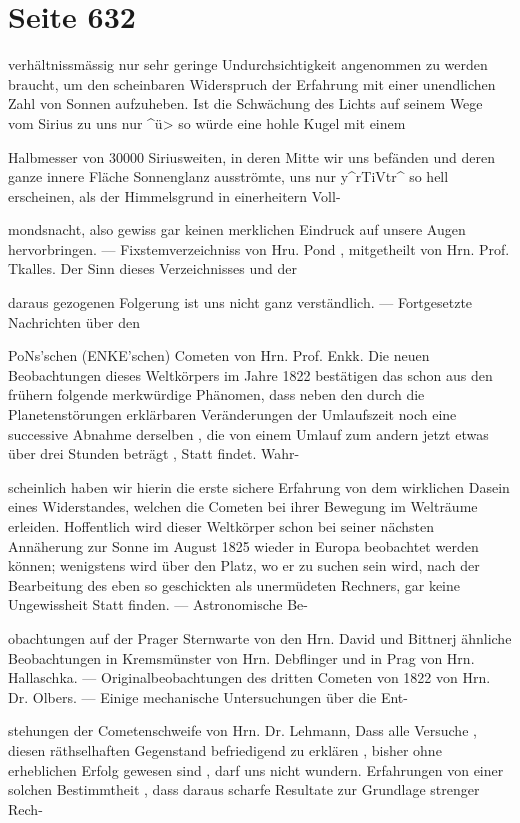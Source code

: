 \documentclass[10pt,a4paper]{article}
\begin{document}
\newpage
\section*{Seite 632}
verhältnissmässig nur sehr geringe Undurchsichtigkeit angenommen zu werden braucht, um den scheinbaren Widerspruch der Erfahrung mit einer unendlichen Zahl von Sonnen aufzuheben. Ist die Schwächung des Lichts auf seinem Wege vom Sirius zu uns nur \textasciicircum{}ü> so würde eine hohle Kugel mit einem

Halbmesser von 30000 Siriusweiten, in deren Mitte wir uns befänden und deren ganze innere Fläche Sonnenglanz ausströmte, uns nur y\textasciicircum{}rTiVtr\textasciicircum{} so hell erscheinen, als der Himmelsgrund in einerheitern Voll-

mondsnacht, also gewiss gar keinen merklichen Eindruck auf unsere Augen hervorbringen. — Fixstemverzeichniss von Hru. Pond , mitgetheilt von Hrn. Prof. Tkalles. Der Sinn dieses Verzeichnisses und der

daraus gezogenen Folgerung ist uns nicht ganz verständlich. — Fortgesetzte Nachrichten über den

PoNs'schen (ENKE'schen) Cometen von Hrn. Prof. Enkk. Die neuen Beobachtungen dieses Weltkörpers im Jahre 1822 bestätigen das schon aus den frühern folgende merkwürdige Phänomen, dass neben den durch die Planetenstörungen erklärbaren Veränderungen der Umlaufszeit noch eine successive Abnahme derselben , die von einem Umlauf zum andern jetzt etwas über drei Stunden beträgt , Statt findet. Wahr-

scheinlich haben wir hierin die erste sichere Erfahrung von dem wirklichen Dasein eines Widerstandes, welchen die Cometen bei ihrer Bewegung im Welträume erleiden. Hoffentlich wird dieser Weltkörper schon bei seiner nächsten Annäherung zur Sonne im August 1825 wieder in Europa beobachtet werden können; wenigstens wird über den Platz, wo er zu suchen sein wird, nach der Bearbeitung des eben so geschickten als unermüdeten Rechners, gar keine Ungewissheit Statt finden. — Astronomische Be-

obachtungen auf der Prager Sternwarte von den Hrn. David und Bittnerj ähnliche Beobachtungen in Kremsmünster von Hrn. Debflinger und in Prag von Hrn. Hallaschka. — Originalbeobachtungen des dritten Cometen von 1822 von Hrn. Dr. Olbers. — Einige mechanische Untersuchungen über die Ent-

stehungen der Cometenschweife von Hrn. Dr. Lehmann, Dass alle Versuche , diesen räthselhaften Gegenstand befriedigend zu erklären , bisher ohne erheblichen Erfolg gewesen sind , darf uns nicht wundern. Erfahrungen von einer solchen Bestimmtheit , dass daraus scharfe Resultate zur Grundlage strenger Rech-
\end{document}
